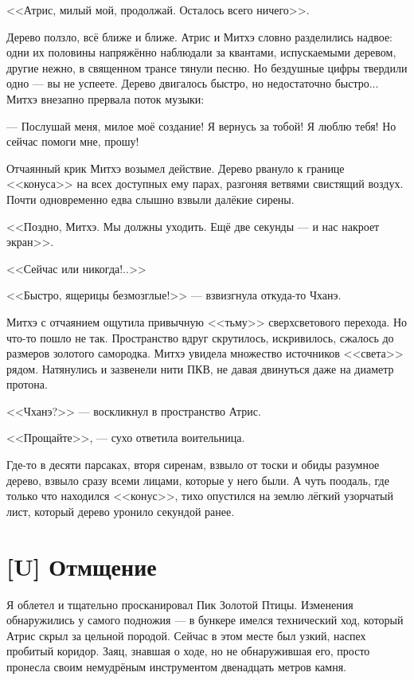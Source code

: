 <<Атрис, милый мой, продолжай.
Осталось всего ничего>>.

Дерево ползло, всё ближе и ближе.
Атрис и Митхэ словно разделились надвое: одни их половины напряжённо наблюдали за квантами, испускаемыми деревом, другие нежно, в священном трансе тянули песню.
Но бездушные цифры твердили одно --- вы не успеете.
Дерево двигалось быстро, но недостаточно быстро...
Митхэ внезапно прервала поток музыки:

--- Послушай меня, милое моё создание!
Я вернусь за тобой!
Я люблю тебя!
Но сейчас помоги мне, прошу!

Отчаянный крик Митхэ возымел действие.
Дерево рвануло к границе <<конуса>> на всех доступных ему парах, разгоняя ветвями свистящий воздух.
Почти одновременно едва слышно взвыли далёкие сирены.

<<Поздно, Митхэ.
Мы должны уходить.
Ещё две секунды --- и нас накроет экран>>.

<<Сейчас или никогда!..>>

<<Быстро, ящерицы безмозглые!>> --- взвизгнула откуда-то Чханэ.

Митхэ с отчаянием ощутила привычную <<тьму>> сверхсветового перехода.
Но что-то пошло не так.
Пространство вдруг скрутилось, искривилось, сжалось до размеров золотого самородка.
Митхэ увидела множество источников <<света>> рядом.
Натянулись и зазвенели нити ПКВ, не давая двинуться даже на диаметр протона.

<<Чханэ?>> --- воскликнул в пространство Атрис.

<<Прощайте>>, --- сухо ответила воительница.

Где-то в десяти парсаках, вторя сиренам, взвыло от тоски и обиды разумное дерево, взвыло сразу всеми лицами, которые у него были.
А чуть поодаль, где только что находился <<конус>>, тихо опустился на землю лёгкий узорчатый лист, который дерево уронило секундой ранее.

\section{[U] Отмщение}

\textspace

Я облетел и тщательно просканировал Пик Золотой Птицы.
Изменения обнаружились у самого подножия --- в бункере имелся технический ход, который Атрис скрыл за цельной породой.
Сейчас в этом месте был узкий, наспех пробитый коридор.
Заяц, знавшая о ходе, но не обнаружившая его, просто пронесла своим немудрёным инструментом двенадцать метров камня.

